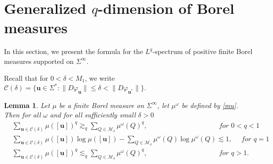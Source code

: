 \documentclass[12pt]{amsart}
\theoremstyle{plain}
\newtheorem{lem}[thm]{Lemma}
\theoremstyle{definition}
\theoremstyle{remark}
\newcommand{\bu}{\mathbf{u}}
\begin{document}
\section{Generalized $q$-dimension of Borel measures}\label{sec:GQBM}
In this section, we present the formula for the 
$L^q$-spectrum of positive finite Borel measures supported on $\Sigma^\infty$.

Recall that for $0<\delta<M_1$, we write $\mathcal{C}(\delta)=\{\mathbf{u}\in\Sigma^*:   \|D\varphi_\mathbf{u}\|\le \delta< \|D\varphi_{\mathbf{u}^*}\|\}$.




\begin{lem}\label{u<Q}
Let $\mu$ be a finite Borel measure on $\Sigma^\infty$, let $\mu^\omega$ be defined by \eqref{mu}. Then for all $\omega$ and for all sufficiently small $\delta>0$
\begin{equation*}\begin{split}
&\sum_{\mathbf{u}\in\mathcal{C}(\delta)}\mu([\bu])^q\gtrsim_q\sum_{Q\in{\mathcal{M}_\delta}}\mu^\omega(Q)^q, \qquad\qquad\qquad\qquad\qquad \textit{ for $0<q<1$} \\ 
&\sum_{\mathbf{u}\in\mathcal{C}(\delta)}\mu([\bu])\log \mu([\bu])-\sum_{Q\in{\mathcal{M}_\delta}}\mu^\omega(Q)\log \mu^\omega(Q)\lesssim 1, \quad \textit{ for $q=1$} \\ 
&\sum_{\mathbf{u}\in\mathcal{C}(\delta)}\mu([\bu])^q\lesssim_q\sum_{Q\in{\mathcal{M}_\delta}}\mu^\omega(Q)^q,  \qquad\qquad\qquad\qquad\qquad \textit{ for $q>1$}. 
\end{split}
\end{equation*}
\end{lem}
\end{document}
